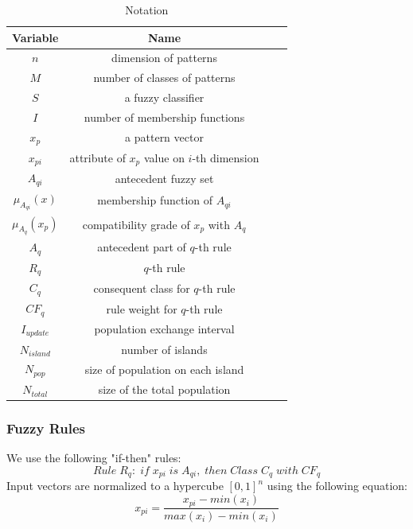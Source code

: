 \documentclass[conference]{IEEEtran}
\begin{document}
  \begin{table}[H]
    
    \centering
      \begin{tabular}{cccc}
      \toprule
      Variable&Name\\
      \midrule
      $n$&dimension of patterns\\
      $M$&number of classes of patterns\\
      $S$&a fuzzy classifier\\
      $I$&number of membership functions\\
      $x_p$&a pattern vector\\
      $x_{pi}$&attribute of $x_p$ value on $i$-th dimension\\
      $A_{qi}$&antecedent fuzzy set\\
      $\mu_{A_{qi}}(x)$&membership function of $A_{qi}$\\
      $\mu_{A_{q}}(x_p)$&compatibility grade of $x_p$ with $A_q$\\
      $A_q$&antecedent part of $q$-th rule\\
      
      $R_q$&$q$-th rule\\
      $C_q$&consequent class for $q$-th rule\\
      $CF_q$&rule weight for $q$-th rule\\
      $I_{update}$&population exchange interval\\
      $N_{island}$&number of islands\\
      $N_{pop}$&size of population on each island\\
      $N_{total}$&size of the total population\\
  \bottomrule
  \end{tabular}
  \caption{Notation}
  \label{table:1}
  \end{table}

  \subsubsection{Fuzzy Rules}
    We use the following "if-then" rules:
\begin{equation}
Rule\;R_q:\;if\;x_{pi}\;is\;A_{qi},\;then\;Class\;C_q\;with\;CF_q
\end{equation}  
Input vectors are normalized to a hypercube $[0,1]^n$ using the following equation:
\begin{equation}x_{pi}=\frac{x_{pi}-min(x_{i})}{max(x_{i})-min(x_{i})}\end{equation}
\end{document}
